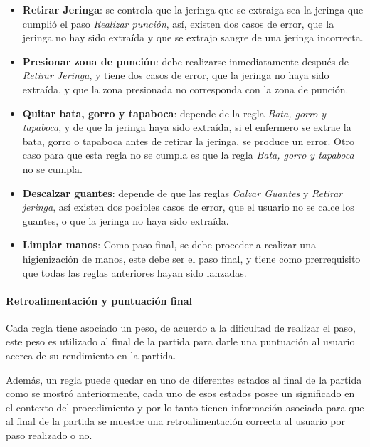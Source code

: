 \begin{itemize}
\item \textbf{Retirar Jeringa}: se controla que la jeringa que se extraiga sea
    la jeringa que cumplió el paso \emph{Realizar punción}, así, existen dos
    casos de error, que la jeringa no hay sido extraída y que se extrajo sangre
    de una jeringa incorrecta.

\item \textbf{Presionar zona de punción}: debe realizarse inmediatamente después
    de \emph{Retirar Jeringa}, y tiene dos casos de error, que la jeringa no
    haya sido extraída, y que la zona presionada no corresponda con la zona de
    punción.

\item \textbf{Quitar bata, gorro y tapaboca}: depende de la regla \emph{Bata,
        gorro y tapaboca}, y de que la jeringa haya sido extraída, si el
    enfermero se extrae la bata, gorro o tapaboca antes de retirar la jeringa, se
    produce un error. Otro caso para que esta regla no se cumpla es que la regla
    \emph{Bata, gorro y tapaboca} no se cumpla.

\item \textbf{Descalzar guantes}: depende de que las reglas \emph{Calzar
        Guantes} y \emph{Retirar jeringa}, así existen dos posibles casos de
    error, que el usuario no se calce los guantes, o que la jeringa no haya sido
    extraída.

\item \textbf{Limpiar manos}: Como paso final, se debe proceder a realizar una
    higienización de manos, este debe ser el paso final, y tiene como
    prerrequisito que todas las reglas anteriores hayan sido lanzadas.

\end{itemize}

\paragraph{Retroalimentación y puntuación final}
\label{sec:puntuacion_hemocultivo}

Cada regla tiene asociado un peso, de acuerdo a la dificultad de realizar el
paso, este peso es utilizado al final de la partida para darle una puntuación al
usuario acerca de su rendimiento en la partida.

Además, un regla puede quedar en uno de diferentes estados al final de la
partida como se mostró anteriormente, cada uno de esos estados posee un
significado en el contexto del procedimiento y por lo tanto tienen información
asociada para que al final de la partida se muestre una retroalimentación
correcta al usuario por paso realizado o no.

